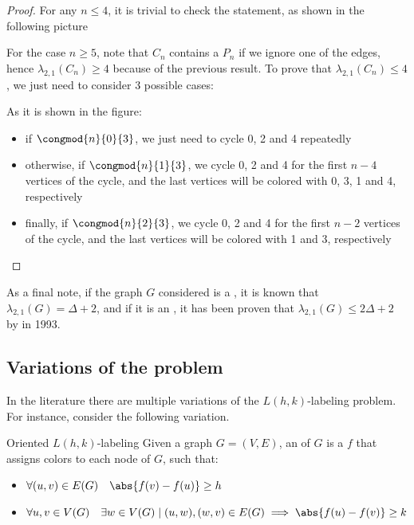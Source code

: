 \documentclass[a4paper, 12pt]{report}
\begin{document}
    \begin{proof}
        For any $n \le 4$, it is trivial to check the statement, as shown in the following picture


        For the case $n \ge 5$, note that $C_n$ contains a $P_n$ if we ignore one of the edges, hence $\lambda_{2,1}(C_n) \ge 4$ because of the previous result. To prove that $\lambda_{2,1}(C_n) \le 4$, we just need to consider 3 possible cases:


        As it is shown in the figure:

        \begin{itemize}
            \item if $\congmod{n}{0}{3}$, we just need to cycle 0, 2 and 4 repeatedly
            \item otherwise, if $\congmod{n}{1}{3}$, we cycle 0, 2 and 4 for the first $n - 4$ vertices of the cycle, and the last vertices will be colored with 0, 3, 1 and 4, respectively
            \item finally, if $\congmod{n}{2}{3}$, we cycle 0, 2 and 4 for the first $n - 2$ vertices of the cycle, and the last vertices will be colored with 1 and 3, respectively
        \end{itemize}
    \end{proof}

    As a final note, if the graph $G$ considered is a \href{https://en.wikipedia.org/wiki/Lattice_graph}{}, it is known that $\lambda_{2,1}(G) = \Delta + 2$, and if it is an \href{https://en.wikipedia.org/wiki/Outerplanar_graph}{}, it has been proven that $\lambda_{2,1}(G) \le 2 \Delta + 2$ by \textcite{jonas} in 1993.

    \subsection{Variations of the problem}

    In the literature there are multiple variations of the $L(h, k)$-labeling problem. For instance, consider the following variation.

    \begin{frameddefn}{Oriented $L(h,k)$-labeling}
        Given a  graph $G= (V, E)$, an  of $G$ is a  $f$ that assigns colors to each node of $G$, such that:

        \begin{itemize}
            \item $\forall (u, v) \in E(G) \quad \abs{f(v) - f(u)} \ge h$
            \item $\forall u, v \in V(G) \quad \exists w \in V(G) \mid (u, w), (w, v) \in E(G) \implies \abs{f(u) - f(v)} \ge k$
        \end{itemize}
    \end{frameddefn}
\end{document}
